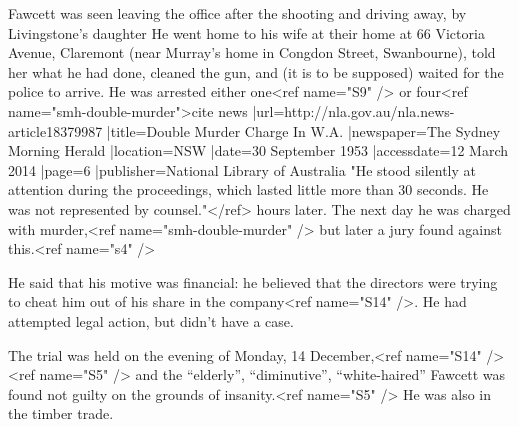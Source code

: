 Fawcett was seen leaving the office after the shooting and driving away, by Livingstone's daughter\cite{FawcettRemanded} He went home to his wife at their home at 66 Victoria Avenue, Claremont (near Murray's home in Congdon Street, Swanbourne)\cite{FawcettRemanded}, told her what he had done, cleaned the gun, and (it is to be supposed) waited for the police to arrive.\cite{DoubleMurder}  He was arrested either one<ref name="S9" /> or four<ref name="smh-double-murder">{{cite news |url=http://nla.gov.au/nla.news-article18379987 |title=Double Murder Charge In W.A. |newspaper=The Sydney Morning Herald |location=NSW |date=30 September 1953 |accessdate=12 March 2014 |page=6 |publisher=National Library of Australia}} "He stood silently at attention during the proceedings, which lasted little more than 30 seconds. He was not represented by counsel."</ref> hours later.  The next day he was charged with murder,<ref name="smh-double-murder" /> but later a jury found against this.<ref name="s4" />

He said that his motive was financial: he believed that the directors were trying to cheat him out of his share in the company\cite{DoubleMurder}<ref name="S14" />.  He had attempted legal action, but didn't have a case.\cite{DoubleMurder}

The trial was held on the evening of Monday, 14 December,<ref name="S14" /><ref name="S5" /> and the ``elderly'', ``diminutive'', ``white-haired''\cite{NewAngle} Fawcett was found not guilty on the grounds of insanity.<ref name="S5" />  He was also in the timber trade.\cite{FawcettRemanded}
